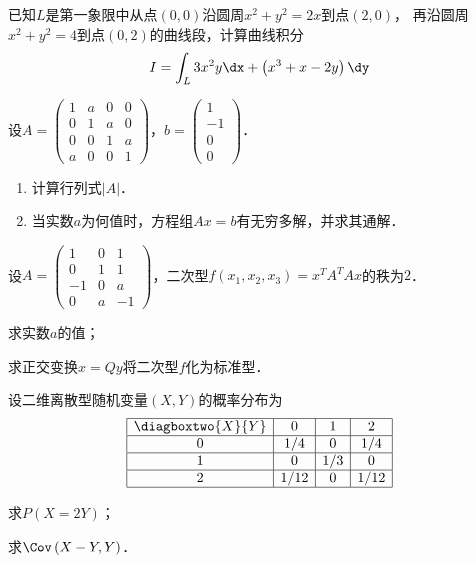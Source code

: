 \documentclass[plain,noanswer,medmath]{../../template/jnuexam}
\begin{document}
\begin{problem}[points=10]
已知$L$是第一象限中从点$\left(0,0 \right)$沿圆周$x^2 + y^2 = 2x$到点$\left(2,0 \right)$，
再沿圆周\goodbreak$x^2 + y^2 = 4$到点$\left(0,2 \right)$的曲线段，计算曲线积分
$$I=\int_L 3x^2 y\dx + \left(x^3 + x - 2y \right)\dy$$
\end{problem}


\begin{problem}[points=11]
设$A = \begin{pmatrix}
  1 & a & 0 & 0 \\
  0 & 1 & a & 0 \\
  0 & 0 & 1 & a \\
  a & 0 & 0 & 1
\end{pmatrix}$，$b = \begin{pmatrix}
  1 \\
  -1 \\
  0 \\
  0
\end{pmatrix}$．
\begin{enumerate}
\item 计算行列式$|A|$．
\item 当实数$a$为何值时，方程组$Ax = b$有无穷多解，并求其通解．
\end{enumerate}
\end{problem}


\begin{problem}[points=11]
设$A = \begin{pmatrix}
   1 & 0 & 1 \\
   0 & 1 & 1 \\
  -1 & 0 & a \\
   0 & a & -1
\end{pmatrix}$，二次型$f(x_1,x_2,x_3) = x^T A^T Ax$的秩为$2$．\par
\begin{enumerate*}
\item 求实数$a$的值；\item 求正交变换$x = Qy$将二次型$f$化为标准型．
\end{enumerate*}
\end{problem}


\begin{problem}[points=11]
设二维离散型随机变量$(X,Y)$的概率分布为
\[\begin{array}{|c|c|c|c|}
\hline
  \diagboxtwo{X}{Y} & 0    & 1   & 2    \\
\hline
       0            & 1/4  & 0   & 1/4  \\
\hline
       1            & 0    & 1/3 & 0    \\
\hline
       2            & 1/12 & 0   & 1/12 \\
\hline
\end{array}\]
\begin{enumerate*}
\item 求$P(X = 2Y)$；\item 求$\Cov \left(X - Y,Y \right)$．
\end{enumerate*}

\end{problem}
\end{document}
